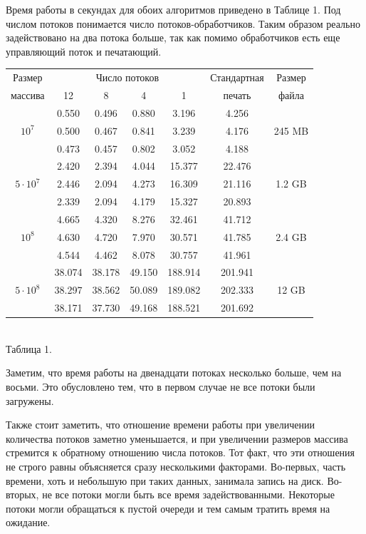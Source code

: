Время работы в секундах для обоих алгоритмов приведено в Таблице 1.
Под числом потоков понимается число потоков-обработчиков. 
Таким образом реально задействовано на два потока больше, так как помимо обработчиков есть еще управляющий поток и печатающий.
\begin{center}
\begin{tabular}{||c|c|c|c|c|c|c||}
\hline
\hline
Размер & \multicolumn{4}{c|}{Число потоков} & Стандартная & Размер\\
\hhline{~|-|-|-|-|~|~|}
массива & 12 & 8 & 4 & 1 & печать &файла\\
\hline
\hline
& 0.550 & 0.496 & 0.880 & 3.196 & 4.256 & \\
\hhline{~|-|-|-|-|-|~|}
$10^7$  & 0.500 & 0.467 & 0.841 & 3.239 & 4.176 & 245 MB \\
\hhline{~|-|-|-|-|-|~|}
& 0.473 & 0.457 & 0.802 & 3.052 & 4.188 &\\
\hline
& 2.420 &2.394& 4.044 & 15.377 & 22.476 & \\
\hhline{~|-|-|-|-|-|~|}
$5 \cdot 10^7$  & 2.446 & 2.094& 4.273 & 16.309 & 21.116 &  1.2 GB\\
\hhline{~|-|-|-|-|-|~|}
& 2.339 & 2.094 & 4.179 & 15.327 & 20.893 & \\
\hline
& 4.665 & 4.320 & 8.276 & 32.461 & 41.712 & \\
\hhline{~|-|-|-|-|-|~|}
$10^8$  & 4.630 & 4.720 & 7.970 & 30.571 & 41.785 & 2.4 GB\\
\hhline{~|-|-|-|-|-|~|}
& 4.544 & 4.462& 8.078 & 30.757 & 41.961 & \\
\hline
 & 38.074 & 38.178 & 49.150 & 188.914 & 201.941 & \\
\hhline{~|-|-|-|-|-|~|}
$5 \cdot 10^8$ & 38.297 & 38.562 & 50.089 & 189.082 & 202.333 & 12 GB\\
\hhline{~|-|-|-|-|-|~|}
 & 38.171 & 37.730 & 49.168 & 188.521 & 201.692 & \\
\hline
\hline
\end{tabular}\\ \vspace{10pt}
\small{Таблица 1.}
\end{center}
Заметим, что время работы на двенадцати потоках несколько больше, чем на восьми. 
Это обусловлено тем, что в первом случае не все потоки были загружены.

Также стоит заметить, что отношение времени работы при увеличении количества потоков заметно уменьшается, и при увеличении размеров массива стремится к обратному отношению числа потоков.
Тот факт, что эти отношения не строго равны объясняется сразу несколькими факторами.
Во-первых, часть времени, хоть и небольшую при таких данных, занимала запись на диск.
Во-вторых, не все потоки могли быть все время задействованными.
Некоторые потоки могли обращаться к пустой очереди и тем самым тратить время на ожидание.

